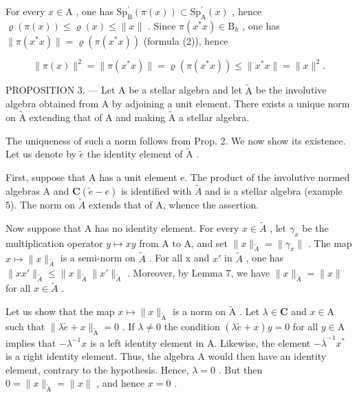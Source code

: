 For every \(x \in \mathrm{A}\) , one has \(\mathrm{Sp}_{\mathrm{B}}^{\prime}(\pi(x)) \subset \mathrm{Sp}_{\mathrm{A}}^{\prime}(x)\) , hence \(\varrho(\pi(x)) \leqslant \varrho(x) \leqslant \|x\|\) . Since \(\pi(x^{*}x) \in \mathrm{B}_{h}\) , one has \(\|\pi(x^{*}x)\| = \varrho(\pi(x^{*}x))\) (formula (2)), hence

\[
\| \pi (x) \| ^ {2} = \| \pi (x ^ {*} x) \| = \varrho (\pi (x ^ {*} x)) \leqslant \| x ^ {*} x \| = \| x \| ^ {2}.
\]

PROPOSITION 3. --- Let A be a stellar algebra and let \(\widetilde{\mathrm{A}}\) be the involutive algebra obtained from A by adjoining a unit element. There exists a unique norm on \(\widetilde{\mathrm{A}}\) extending that of A and making \(\widetilde{\mathrm{A}}\) a stellar algebra.

The uniqueness of such a norm follows from Prop. 2. We now show its existence. Let us denote by \(\widetilde{e}\) the identity element of \(\widetilde{\mathrm{A}}\) .

First, suppose that A has a unit element e. The product of the involutive normed algebras A and \(\mathbf{C}(\widetilde{e}-e)\) is identified with \(\widetilde{A}\) and is a stellar algebra (example 5). The norm on \(\widetilde{A}\) extends that of A, whence the assertion.

Now suppose that A has no identity element. For every \(x \in \widetilde{A}\) , let \(\gamma_{x}\) be the multiplication operator \(y \mapsto xy\) from A to A, and set \(\|x\|_{\widetilde{A}} = \| \gamma_{x}\|\) . The map \(x \mapsto \|x\|_{\widetilde{A}}\) is a semi-norm on \(\widetilde{A}\) . For all x and \(x'\) in \(\widetilde{A}\) , one has \(\|xx'\|_{\widetilde{A}} \leqslant \|x\|_{\widetilde{A}} \|x'\|_{\widetilde{A}}\) . Moreover, by Lemma 7, we have \(\|x\|_{\widetilde{A}} = \|x\|\) for all \(x \in \widetilde{A}\) .

Let us show that the map \(x \mapsto \|x\|_{\widetilde{\mathrm{A}}}\) is a norm on \(\widetilde{\mathrm{A}}\) . Let \(\lambda \in \mathbf{C}\) and \(x \in \mathrm{A}\) such that \(\| \lambda \widetilde{e} + x\|_{\widetilde{\mathrm{A}}} = 0\) . If \(\lambda \neq 0\) the condition \((\lambda \widetilde{e} + x)y = 0\) for all \(y \in \mathrm{A}\) implies that \(-\lambda^{-1}x\) is a left identity element in A. Likewise, the element \(-\overline{\lambda}^{-1}x^{*}\) is a right identity element. Thus, the algebra A would then have an identity element, contrary to the hypothesis. Hence, \(\lambda = 0\) . But then \(0 = \|x\|_{\widetilde{\mathrm{A}}} = \|x\|\) , and hence \(x = 0\) .

